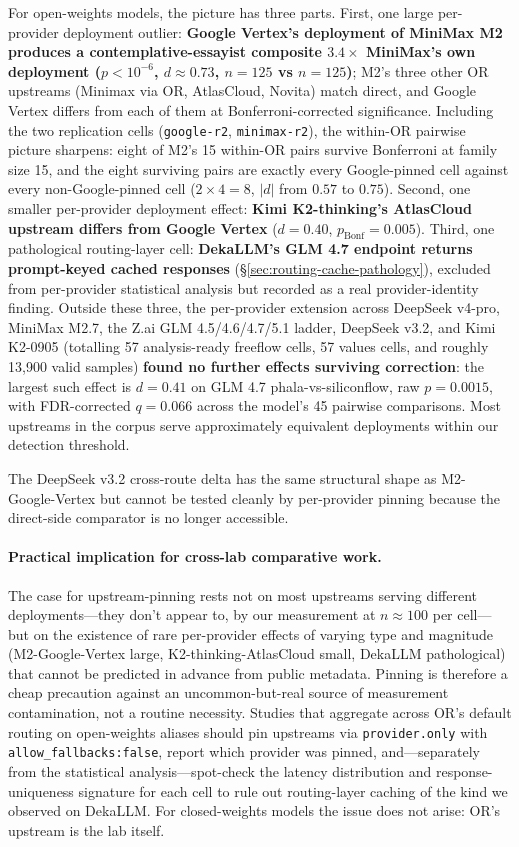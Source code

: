 \documentclass[11pt,a4paper]{article}
\begin{document}
For open-weights models, the picture has three parts. First, one large per-provider deployment outlier: \textbf{Google Vertex's deployment of MiniMax M2 produces a contemplative-essayist composite $3.4\times$ MiniMax's own deployment ($p < 10^{-6}$, $d \approx 0.73$, $n{=}125$ vs $n{=}125$)}; M2's three other OR upstreams (Minimax via OR, AtlasCloud, Novita) match direct, and Google Vertex differs from each of them at Bonferroni-corrected significance. Including the two replication cells (\texttt{google-r2}, \texttt{minimax-r2}), the within-OR pairwise picture sharpens: eight of M2's 15 within-OR pairs survive Bonferroni at family size 15, and the eight surviving pairs are exactly every Google-pinned cell against every non-Google-pinned cell ($2 \times 4 = 8$, $|d|$ from $0.57$ to $0.75$). Second, one smaller per-provider deployment effect: \textbf{Kimi K2-thinking's AtlasCloud upstream differs from Google Vertex} ($d{=}0.40$, $p_\text{Bonf}{=}0.005$). Third, one pathological routing-layer cell: \textbf{DekaLLM's GLM 4.7 endpoint returns prompt-keyed cached responses} (\S\ref{sec:routing-cache-pathology}), excluded from per-provider statistical analysis but recorded as a real provider-identity finding. Outside these three, the per-provider extension across DeepSeek v4-pro, MiniMax M2.7, the Z.ai GLM 4.5/4.6/4.7/5.1 ladder, DeepSeek v3.2, and Kimi K2-0905 (totalling 57 analysis-ready freeflow cells, 57 values cells, and roughly 13{,}900 valid samples) \textbf{found no further effects surviving correction}: the largest such effect is $d{=}0.41$ on GLM 4.7 phala-vs-siliconflow, raw $p{=}0.0015$, with FDR-corrected $q{=}0.066$ across the model's 45 pairwise comparisons. Most upstreams in the corpus serve approximately equivalent deployments within our detection threshold.

The DeepSeek v3.2 cross-route delta has the same structural shape as M2-Google-Vertex but cannot be tested cleanly by per-provider pinning because the direct-side comparator is no longer accessible.

\paragraph{Practical implication for cross-lab comparative work.} The case for upstream-pinning rests not on most upstreams serving different deployments---they don't appear to, by our measurement at $n \approx 100$ per cell---but on the existence of rare per-provider effects of varying type and magnitude (M2-Google-Vertex large, K2-thinking-AtlasCloud small, DekaLLM pathological) that cannot be predicted in advance from public metadata. Pinning is therefore a cheap precaution against an uncommon-but-real source of measurement contamination, not a routine necessity. Studies that aggregate across OR's default routing on open-weights aliases should pin upstreams via \texttt{provider.only} with \texttt{allow\_fallbacks:false}, report which provider was pinned, and---separately from the statistical analysis---spot-check the latency distribution and response-uniqueness signature for each cell to rule out routing-layer caching of the kind we observed on DekaLLM. For closed-weights models the issue does not arise: OR's upstream is the lab itself.
\end{document}

